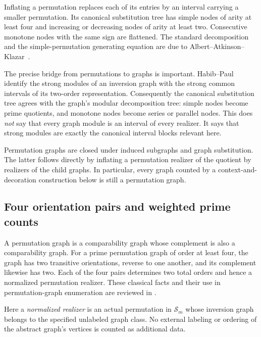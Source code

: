 \documentclass[11pt,letterpaper]{article}
\numberwithin{equation}{section}
\theoremstyle{definition}\newtheorem{definition}[theorem]{Definition}
\theoremstyle{remark}\newtheorem{remark}[theorem]{Remark}
\begin{document}
Inflating a permutation replaces each of its entries by an interval
carrying a smaller permutation. Its canonical substitution tree has
simple nodes of arity at least four and increasing or decreasing
nodes of arity at least two. Consecutive monotone nodes with the
same sign are flattened. The standard decomposition and the
simple-permutation generating equation are due to
Albert--Atkinson--Klazar~\cite{AAK}.

The precise bridge from permutations to graphs is important.
Habib--Paul~\cite[Lemma 20, printed p.~55]{HP} identify the strong
modules of an inversion graph with the strong common intervals of
its two-order representation. Consequently the canonical
substitution tree agrees with the graph's modular decomposition
tree: simple nodes become prime quotients, and monotone nodes become
series or parallel nodes. This does \emph{not} say that every graph
module is an interval of every realizer. It says that strong modules
are exactly the canonical interval blocks relevant here.

Permutation graphs are closed under induced subgraphs and graph
substitution. The latter follows directly by inflating a permutation
realizer of the quotient by realizers of the child graphs. In
particular, every graph counted by a context-and-decoration
construction below is still a permutation graph.

\subsection{Four orientation pairs and weighted prime counts}\label{prg:sec:four}
A permutation graph is a comparability graph whose complement is
also a comparability graph. For a prime permutation graph of order
at least four, the graph has two transitive orientations, reverse
to one another, and its complement likewise has two. Each of the
four pairs determines two total orders and hence a normalized
permutation realizer. These classical facts and their use in
permutation-graph enumeration are reviewed in
\cite{BEK,BBFGP}.

Here a \emph{normalized realizer} is an actual permutation in
$\mathcal S_m$ whose inversion graph belongs to the specified
unlabeled graph class. No external labeling or ordering of the
abstract graph's vertices is counted as additional data.
\end{document}

